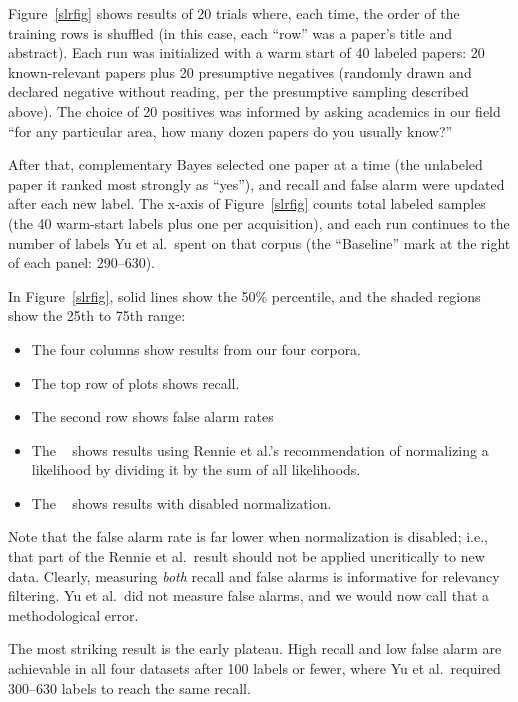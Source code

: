 \documentclass[AMA,STIX2COL]{WileyNJDv5}
\newcommand{\NEW}[1]{\textcolor{newblue}{#1}}
\begin{document}





 Figure~\ref{slrfig} shows results of 20 trials where,
each time, the order of the training rows is shuffled
(in this case, each ``row'' was a paper's title and abstract).
Each run was initialized with a warm start of \NEW{40 labeled
papers: 20 known-relevant papers plus 20 presumptive negatives
(randomly drawn and declared negative without reading, per the
presumptive sampling described above). The choice of 20
positives} was informed by asking academics in our field ``for any particular area, how many dozen papers do you usually
know?''

After that,
complementary Bayes selected one paper at a time (the unlabeled paper
it ranked most strongly as ``yes''), and recall and false alarm were
updated after each new label. \NEW{The x-axis of
Figure~\ref{slrfig} counts total labeled samples (the 40
warm-start labels plus one per acquisition), and each run
continues to the number of labels Yu et al.\ spent on that
corpus (the ``Baseline'' mark at the right of each panel:
290--630).} 


 

In  Figure~\ref{slrfig}, 
solid lines show the 50\% percentile, and the shaded
regions show the 25th to 75th range:
\begin{itemize}
\item
The four columns show results from our four 
corpora.
\item
The top row
of plots shows recall.
\item
The second row shows  false alarm rates
\item The 
 \color{ruby}{\bf red lines}\color{black}~ shows results using
 Rennie et al.'s recommendation of normalizing a likelihood
 by dividing it by the sum of all likelihoods.
 \item
 The  \color{slateblue}{\bf blue lines}\color{black}~
 shows results with disabled normalization.
 \end{itemize}
Note that the false alarm rate is far lower
when normalization is disabled; i.e., that part of
the Rennie et al.\ result should not be applied
uncritically to new data.
Clearly,  measuring {\em both} recall and false
alarms is informative for relevancy filtering.
 Yu et al.\ did not measure false alarms, and we would now
 call that a methodological error.
  
The most striking result is the early plateau. High recall
and low false alarm are achievable in all four datasets
after 100 labels or fewer, where Yu et al.\ required
\NEW{300--630} labels to reach the same recall.
\end{document}
